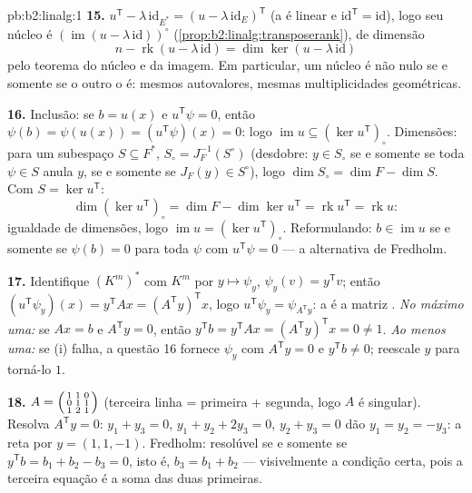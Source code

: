 \begin{solution}{pb:b2:linalg:1}
\textbf{15.} $u^{\mathsf T} - \lambda\,\mathrm{id}_{E^*} = (u -
\lambda\,\mathrm{id}_E)^{\mathsf T}$ (a  é linear e
$\mathrm{id}^{\mathsf T} = \mathrm{id}$), logo seu núcleo é
$(\operatorname{im}(u - \lambda\,\mathrm{id}))^\circ$
(\cref{prop:b2:linalg:transposerank}), de dimensão
\[
n - \operatorname{rk}(u - \lambda\,\mathrm{id})
= \dim\ker(u - \lambda\,\mathrm{id})
\]
pelo teorema do núcleo e da imagem. Em particular, um núcleo é não nulo se e somente se o
outro o é: mesmos autovalores, mesmas multiplicidades geométricas.

\textbf{16.} Inclusão: se $b = u(x)$ e $u^{\mathsf T}\psi =
0$, então $\psi(b) = \psi(u(x)) = (u^{\mathsf T}\psi)(x) = 0$: logo
$\operatorname{im} u \subseteq (\ker u^{\mathsf T})_\circ$.
Dimensões: para um subespaço $S \subseteq F^*$, $S_\circ =
J_F^{-1}(S^\circ)$ (desdobre: $y \in S_\circ$ se e somente se toda $\psi \in
S$ anula $y$, se e somente se $J_F(y) \in S^\circ$), logo $\dim S_\circ = \dim
F - \dim S$. Com $S = \ker u^{\mathsf T}$:
\[
\dim(\ker u^{\mathsf T})_\circ
= \dim F - \dim\ker u^{\mathsf T}
= \operatorname{rk} u^{\mathsf T} = \operatorname{rk} u :
\]
igualdade de dimensões, logo $\operatorname{im} u = (\ker
u^{\mathsf T})_\circ$. Reformulando: $b \in \operatorname{im} u$ se e somente se
$\psi(b) = 0$ para toda $\psi$ com $u^{\mathsf T}\psi = 0$ ---
a alternativa de Fredholm.

\textbf{17.} Identifique $(K^m)^*$ com $K^m$ por $y \mapsto \psi_y$,
$\psi_y(v) = y^{\mathsf T}v$; então $(u^{\mathsf T}\psi_y)(x) =
y^{\mathsf T}Ax = (A^{\mathsf T}y)^{\mathsf T}x$, logo $u^{\mathsf
T}\psi_y = \psi_{A^{\mathsf T}y}$: a  é a
matriz . \emph{No máximo uma:} se $Ax = b$ e
$A^{\mathsf T}y = 0$, então $y^{\mathsf T}b = y^{\mathsf T}Ax =
(A^{\mathsf T}y)^{\mathsf T}x = 0 \neq 1$. \emph{Ao menos uma:}
se (i) falha, a questão 16 fornece $\psi_y$ com $A^{\mathsf T}y
= 0$ e $y^{\mathsf T}b \neq 0$; reescale $y$ para torná-lo $1$.

\textbf{18.} $A = \begin{psmallmatrix} 1 & 1 & 0\\ 0 & 1 & 1\\
1 & 2 & 1\end{psmallmatrix}$ (terceira linha = primeira + segunda, logo $A$
é singular). Resolva $A^{\mathsf T}y = 0$: $y_1 + y_3 = 0$, $y_1
+ y_2 + 2y_3 = 0$, $y_2 + y_3 = 0$ dão $y_1 = y_2 = -y_3$: a
reta  por $y = (1, 1, -1)$. Fredholm: resolúvel se e somente se
$y^{\mathsf T}b = b_1 + b_2 - b_3 = 0$, isto é, $b_3 = b_1 + b_2$
--- visivelmente a condição certa, pois a terceira equação é a
soma das duas primeiras.


\end{solution}
